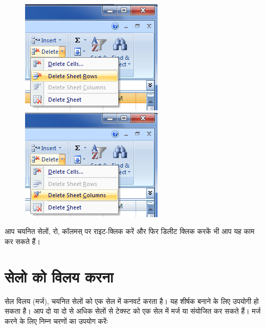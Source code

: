 \begin{figure}[H]
\centering
\includegraphics[scale=0.65]{src/images/chapter1/chapter1_fig33.png}\qquad
\includegraphics[scale=0.65]{src/images/chapter1/chapter1_fig34.png}
\end{figure}

आप चयनित सेलों, रो, कॉलमस् पर राइट-क्लिक करें और फिर डिलीट क्लिक करकें भी आप यह काम कर सकते हैं।

	
\section{सेलो को विलय करना}\label{id-1.17}

सेल विलय (मर्ज), चयनित सेलों को एक सेल में कनवर्ट करता है। यह शीर्षक बनाने के लिए उपयोगी हो सकता है। आप दो या दो से अधिक सेलों से टेक्स्ट को एक सेल में मर्ज या संयोजित कर सकते हैं। मर्ज करने के लिए निम्न चरणों का उपयोग करेंः

